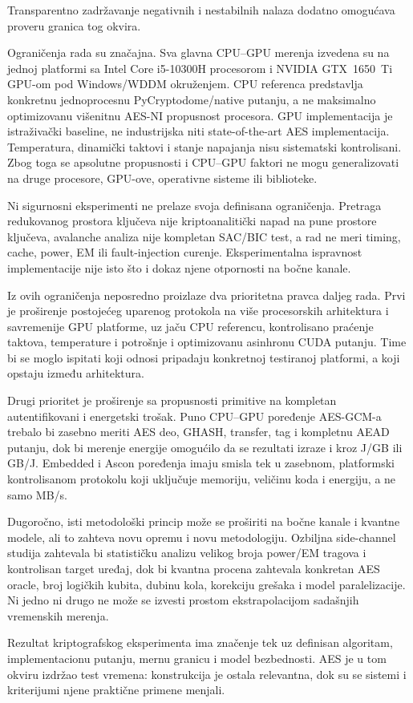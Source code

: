 Transparentno zadržavanje negativnih i nestabilnih nalaza dodatno
omogućava proveru granica tog okvira.

Ograničenja rada su značajna. Sva glavna CPU--GPU merenja izvedena su na
jednoj platformi sa Intel Core i5-10300H procesorom i NVIDIA GTX~1650~Ti
GPU-om pod Windows/WDDM okruženjem. CPU referenca predstavlja konkretnu
jednoprocesnu PyCryptodome/native putanju, a ne maksimalno optimizovanu
višenitnu AES-NI propusnost procesora. GPU implementacija je istraživački
baseline, ne industrijska niti state-of-the-art AES implementacija.
Temperatura, dinamički taktovi i stanje napajanja nisu sistematski
kontrolisani. Zbog toga se apsolutne propusnosti i CPU--GPU faktori ne
mogu generalizovati na druge procesore, GPU-ove, operativne sisteme ili
biblioteke.

Ni sigurnosni eksperimenti ne prelaze svoja definisana ograničenja.
Pretraga redukovanog prostora ključeva nije kriptoanalitički napad na pune prostore
ključeva, avalanche analiza nije kompletan SAC/BIC test, a rad ne meri
timing, cache, power, EM ili fault-injection curenje. Eksperimentalna
ispravnost implementacije nije isto što i dokaz njene otpornosti na
bočne kanale.

Iz ovih ograničenja neposredno proizlaze dva prioritetna pravca daljeg
rada. Prvi je proširenje postojećeg uparenog protokola na više procesorskih
arhitektura i savremenije GPU platforme, uz jaču CPU referencu,
kontrolisano praćenje taktova, temperature i potrošnje i optimizovanu
asinhronu CUDA putanju. Time bi se moglo ispitati koji odnosi pripadaju
konkretnoj testiranoj platformi, a koji opstaju između arhitektura.

Drugi prioritet je proširenje sa propusnosti primitive na kompletan
autentifikovani i energetski trošak. Puno CPU--GPU poređenje AES-GCM-a
trebalo bi zasebno meriti AES deo, GHASH, transfer, tag i kompletnu AEAD
putanju, dok bi merenje energije omogućilo da se rezultati izraze i kroz
J/GB ili GB/J. Embedded i Ascon poređenja imaju smisla tek u zasebnom,
platformski kontrolisanom protokolu koji uključuje memoriju, veličinu
koda i energiju, a ne samo MB/s.

Dugoročno, isti metodološki princip može se proširiti na bočne kanale i
kvantne modele, ali to zahteva novu opremu i novu metodologiju. Ozbiljna
side-channel studija zahtevala bi statističku analizu velikog broja
power/EM tragova i kontrolisan target uređaj, dok bi kvantna procena
zahtevala konkretan AES oracle, broj logičkih kubita, dubinu kola,
korekciju grešaka i model paralelizacije. Ni jedno ni drugo ne može se
izvesti prostom ekstrapolacijom sadašnjih vremenskih merenja.

Rezultat kriptografskog eksperimenta ima značenje tek uz definisan
algoritam, implementacionu putanju, mernu granicu i model bezbednosti.
AES je u tom okviru izdržao test vremena: konstrukcija je ostala
relevantna, dok su se sistemi i kriterijumi njene praktične primene menjali.
